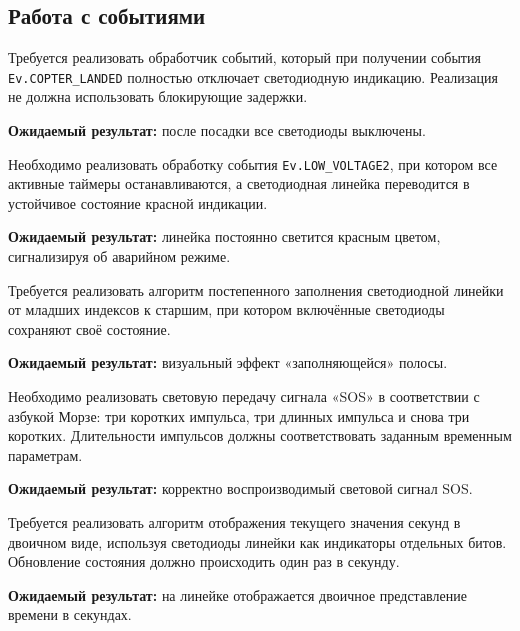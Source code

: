 \subsection{Работа с событиями}

\begin{taskbox}
\indent Требуется реализовать обработчик событий, который при получении события \verb|Ev.COPTER_LANDED| полностью отключает светодиодную индикацию. Реализация не должна использовать блокирующие задержки.

\noindent\textbf{Ожидаемый результат:} после посадки все светодиоды выключены.
\end{taskbox}

\begin{taskbox}
\indent Необходимо реализовать обработку события \verb|Ev.LOW_VOLTAGE2|, при котором все активные таймеры останавливаются, а светодиодная линейка переводится в устойчивое состояние красной индикации.

\noindent\textbf{Ожидаемый результат:} линейка постоянно светится красным цветом, сигнализируя об аварийном режиме.
\end{taskbox}

\begin{taskbox}
\indent Требуется реализовать алгоритм постепенного заполнения светодиодной линейки от младших индексов к старшим, при котором включённые светодиоды сохраняют своё состояние.

\noindent\textbf{Ожидаемый результат:} визуальный эффект «заполняющейся» полосы.
\end{taskbox}

\begin{taskbox}
\indent Необходимо реализовать световую передачу сигнала «SOS» в соответствии с азбукой Морзе: три коротких импульса, три длинных импульса и снова три коротких. Длительности импульсов должны соответствовать заданным временным параметрам.

\noindent\textbf{Ожидаемый результат:} корректно воспроизводимый световой сигнал SOS.
\end{taskbox}

\begin{taskbox}
\indent Требуется реализовать алгоритм отображения текущего значения секунд в двоичном виде, используя светодиоды линейки как индикаторы отдельных битов. Обновление состояния должно происходить один раз в секунду.

\noindent\textbf{Ожидаемый результат:} на линейке отображается двоичное представление времени в секундах.
\end{taskbox}
